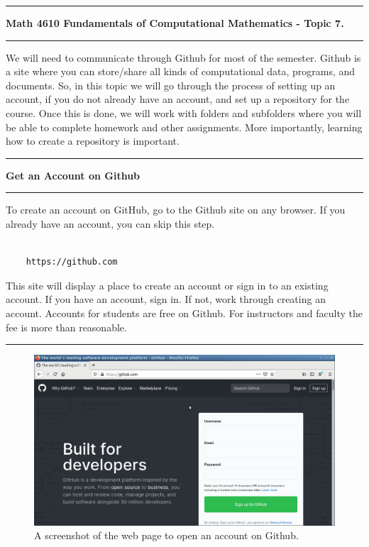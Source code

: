 \documentclass[10pt,fleqn]{article}
\begin{document}
\vskip0.1in\hrule\vskip0.1in \noindent
{\bf Math 4610 Fundamentals of Computational Mathematics  - Topic 7.}
\vskip0.1in\hrule\vskip0.1in \noindent
We will need to communicate through Github for most of the semester. Github is
a site where you can store/share all kinds of computational data, programs, and
documents. So, in this topic we will go through the process of setting up an
account, if you do not already have an account, and set up a repository for the
course. Once this is done, we will work with folders and subfolders where you
will be able to complete homework and other assignments. More importantly, 
learning how to create a repository is important.
\vskip0.1in\hrule\vskip0.1in\noindent
\noindent
{\bf Get an Account on Github} 
\vskip0.1in\hrule\vskip0.1in\noindent
To create an account on GitHub, go to the Github site on any browser. If you
already have an account, you can skip this step.
\begin{verbatim}

    https://github.com

\end{verbatim}
This site will display a place to create an account or sign in to an existing
account. If you have an account, sign in. If not, work through creating an
account. Accounts for students are free on Github. For instructors and faculty
the fee is more than reasonable.
\vskip0.1in\hrule\vskip0.1in
\vfill
\begin{figure}[h]
\centering
\includegraphics[width=5.0in]{../images/github_01.png}
\vskip0.1in
\caption{A screenshot of the web page to open an account on Github.}
\end{figure}
\end{document}
